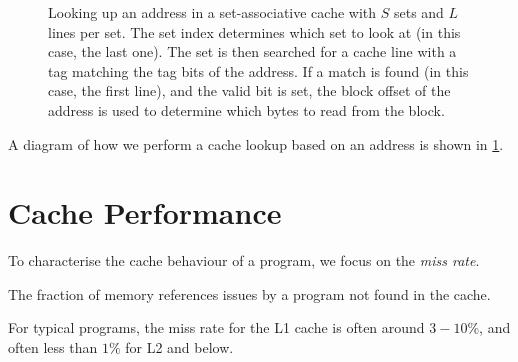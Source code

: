 \begin{figure}

  \caption{Looking up an address in a set-associative cache with $S$
    sets and $L$ lines per set.  The set index determines which set to
    look at (in this case, the last one).  The set is then searched
    for a cache line with a tag matching the tag bits of the address.
    If a match is found (in this case, the first line), and the valid
    bit is set, the block offset of the address is used to determine
    which bytes to read from the block.}
  \label{fig:setassoc-cache-lookup}
\end{figure}

A diagram of how we perform a cache lookup based on an address is
shown in \cref{fig:setassoc-cache-lookup}.

\section{Cache Performance}

To characterise the cache behaviour of a program, we focus on the
\emph{miss rate}.
\begin{definition}
  The fraction of memory references issues by a program not found in the cache.
\end{definition}
For typical programs, the miss rate for the L1 cache is often around
$3-10\%$, and often less than $1\%$ for L2 and below.

